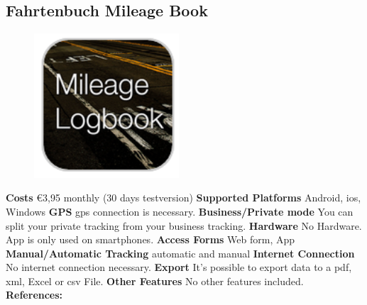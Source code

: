\begin{singlespace}
\section{Fahrtenbuch Mileage Book}
\begin{figure}
  \begin{center}
    \includegraphics[width=0.48\textwidth]{bilder/mileage}
  \end{center}
\end{figure}
\textbf{Costs} \euro 3,95 monthly (30 days testversion)
\newline\newline
\textbf{Supported Platforms} Android, \gls{ios}, Windows
\newline\newline
\textbf{GPS} \gls{gps} connection is necessary.
\newline\newline
\textbf{Business/Private mode} You can split your private tracking from your business tracking.
\newline\newline
\textbf{Hardware} No Hardware. App is only used on smartphones.
\newline\newline
\textbf{Access Forms} Web form, App
\newline\newline
\textbf{Manual/Automatic Tracking} automatic and manual
\newline\newline
\textbf{Internet Connection} No internet connection necessary.
\newline\newline
\textbf{Export} It’s possible to export data to a \gls{pdf}, \gls{xml}, Excel or \gls{csv} File.
\newline\newline
\textbf{Other Features} No other features included.
\newline\newline
\textbf{References:} \cite{Fahrtenbuch_Mileage_Book}
\newpage


\end{singlespace}
